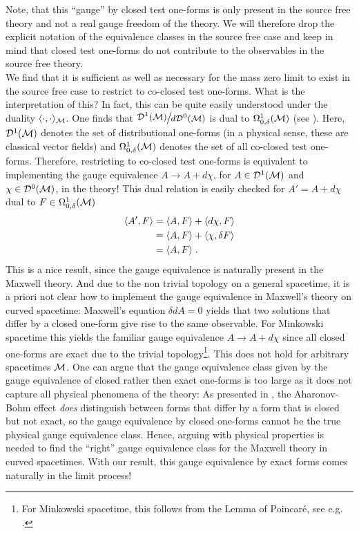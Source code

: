 %
Note, that this ``gauge'' by closed test one-forms is only present in the source free theory and not a real gauge freedom of the theory. We will therefore drop the explicit notation of the equivalence classes in the source free case and keep in mind that closed test one-forms do not contribute to the observables in the source free theory.\\
We find that it is sufficient as well as necessary for the mass zero limit to exist in the source free case to restrict to co-closed test one-forms. What is the interpretation of this?
In fact, this can be quite easily understood under the duality $\langle \cdot , \cdot \rangle_{\mathcal{M}}$. One finds that $\Quotientscale{\mathcal{D}^1(\M)}{d\mathcal{D}^{0}(\M)}$ is dual to $\Omega^1_{0,\delta}(\mathcal{M})$ (see \cite[Section 3.1]{Sanders}). Here, $\mathcal{D}^1(\mathcal{M})$ denotes the set of distributional one-forms (in a physical sense, these are classical vector fields) and $\Omega^1_{0,\delta}(\mathcal{M})$ denotes the set of all co-closed test one-forms. Therefore, restricting to co-closed test one-forms is equivalent to implementing the gauge equivalence $A \to A + d\chi$, for $A \in \mathcal{D}^1(\mathcal{M})$ and $ \chi \in \mathcal{D}^0(\mathcal{M})$, in the theory! This dual relation is easily checked for $A' = A + d\chi$ dual to $F \in \Omega^1_{0,\delta}(\mathcal{M})$
		\begin{align}
			\langle A', F \rangle
			&= \langle A, F \rangle + \langle d\chi, F \rangle \notag\\
			&= \langle A, F \rangle + \langle \chi, \delta F \rangle \notag\\
			&= \langle A, F \rangle \;.
		\end{align}
This is a nice result, since the gauge equivalence is naturally present in the Maxwell theory. And due to the non trivial topology on a general spacetime, it is a priori not clear how to implement the gauge equivalence in Maxwell's theory on curved spacetime: Maxwell's equation $\delta d A = 0$ yields that two solutions that differ by a closed one-form give rise to the same observable. For Minkowski spacetime this yields the familiar gauge equivalence $A \to A + d\chi$ since all closed one-forms are exact due to the trivial topology\footnote{For Minkowski spacetime, this follows from the Lemma of Poincar\'e, see e.g. \cite[Corollary 4.3.11]{rudolph_schmidt}.}. This does not hold for arbitrary spacetimes $\mathcal{M}$. One can argue that the gauge equivalence class given by the gauge equivalence of closed rather then exact one-forms is too large as it does not capture all physical phenomena of the theory: As presented in \cite[p. 626]{Sanders}, the Aharonov-Bohm effect \emph{does} distinguish between forms that differ by a form that is closed but not exact, so the gauge equivalence by closed one-forms cannot be the true physical gauge equivalence class. Hence, arguing with physical properties is needed to find the ``right'' gauge equivalence class for the Maxwell theory in curved spacetimes. With our result, this gauge equivalence by exact forms comes naturally in the limit process! \\
